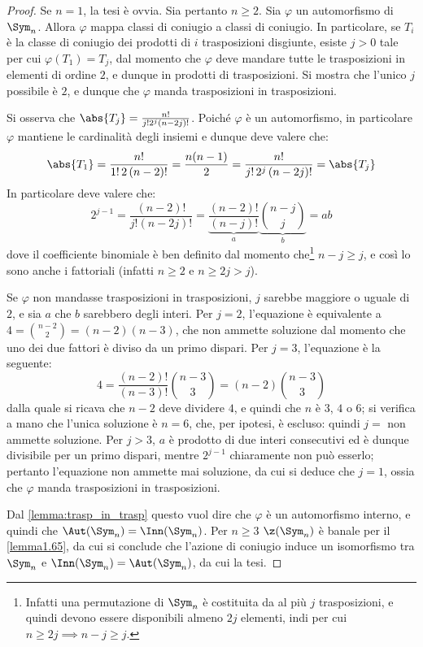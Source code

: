 \documentclass[11pt]{scrartcl}
\begin{document}
	\begin{proof}
		Se $n = 1$, la tesi è ovvia. Sia pertanto $n \geq 2$.
		Sia $\varphi$ un automorfismo di $\Sym_n$. Allora $\varphi$ mappa classi di coniugio
		a classi di coniugio. In particolare, se $T_i$ è la classe di coniugio dei prodotti di $i$ trasposizioni
		disgiunte,
		esiste $j > 0$ tale per cui $\varphi(T_1) = T_j$, dal momento che $\varphi$ deve mandare tutte le trasposizioni in elementi di ordine $2$, e dunque in prodotti di trasposizioni.
		Si mostra che l'unico $j$ possibile
		è $2$, e dunque che $\varphi$ manda trasposizioni in trasposizioni. \medskip
		
		
		Si osserva che $\abs{T_j} = \frac{n!}{j! 2^j (n-2j)!}$.
		Poiché $\varphi$ è un automorfismo, in particolare $\varphi$ mantiene le cardinalità degli
		insiemi e dunque deve valere che:
		\[ \abs{T_1} = \frac{n!}{1! \, 2 \, (n-2)!} = \frac{n(n-1)}{2} = \frac{n!}{j! \, 2^j \, (n-2j)!} = \abs{T_j} \]
		In particolare deve valere che:
		\[ 2^{j-1} = \frac{(n-2)!}{j! (n-2j)!} = \underbrace{\frac{(n-2)!}{(n-j)!}}_a \underbrace{\binom{n-j}{j}}_b = ab \]
		dove il coefficiente binomiale è ben definito dal momento che\footnote{
			Infatti una
			permutazione di $\Sym_n$ è costituita da al più $j$ trasposizioni, e quindi devono essere
			disponibili almeno $2j$ elementi, indi per cui $n \geq 2j \implies n-j \geq j$.
		} $n - j \geq j$, e così lo sono anche i fattoriali (infatti $n \geq 2$ e $n \geq 2j > j$).
		\medskip
		
		
		Se $\varphi$ non mandasse trasposizioni in trasposizioni, $j$ sarebbe maggiore o uguale di $2$,
		e sia $a$ che $b$ sarebbero degli interi. Per $j = 2$, l'equazione è equivalente
		a $4 = \binom{n-2}{2} = (n-2)(n-3)$, che non ammette soluzione dal momento che uno dei due
		fattori è diviso da un primo dispari. Per $j = 3$, l'equazione è la seguente:
		\[ 4 = \frac{(n-2)!}{(n-3)!} \binom{n-3}{3} = (n-2) \binom{n-3}{3} \]
		dalla quale si ricava che $n-2$ deve dividere $4$, e quindi che $n$ è $3$, $4$ o $6$; si
		verifica a mano che l'unica soluzione è $n = 6$, che, per ipotesi, è escluso: quindi $j = $
		non ammette soluzione. Per $j > 3$, $a$ è prodotto di due interi consecutivi ed è dunque
		divisibile per un primo dispari, mentre $2^{j-1}$ chiaramente non può esserlo; pertanto
		l'equazione non ammette mai soluzione, da cui si deduce che $j = 1$, ossia che
		$\varphi$ manda trasposizioni in trasposizioni. \medskip
		
		
		Dal \autoref{lemma:trasp_in_trasp} questo vuol dire che $\varphi$ è un automorfismo interno,
		e quindi che $\Aut(\Sym_n) = \Inn(\Sym_n)$. Per $n \geq 3$ $\z(\Sym_n)$ è banale per il \autoref{lemma1.65}, da cui si conclude che l'azione di coniugio induce un isomorfismo tra $\Sym_n$ e $\Inn(\Sym_n) = \Aut(\Sym_n)$,
		da cui la tesi.
	\end{proof}
	
\end{document}
